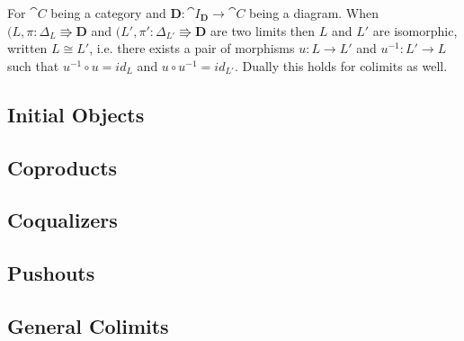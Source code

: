\begin{myprop}
	For $\cat{C}$ being a category and $\mathbf{D}: \cat{I}_\mathbf{D} \to \cat{C}$ being a diagram.
	When $(L, \pi: \Delta_L \Rrightarrow \mathbf{D}$ and $(L', \pi': \Delta_{L'} \Rrightarrow \mathbf{D}$ are two limits then $L$ and $L'$ are isomorphic, written $L \cong L'$, i.e. there exists a pair of morphisms $u: L \to L'$ and $u^{-1}: L' \to L$ such that $u^{-1} \circ u = id_L$ and $u \circ u^{-1} = id_{L'}$.
	Dually this holds for colimits as well.
\end{myprop}
\subsection{Initial Objects}

\subsection{Coproducts}

\subsection{Coqualizers}

\subsection{Pushouts}

\subsection{General Colimits}